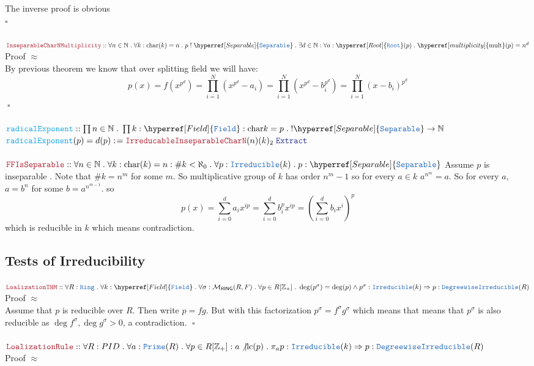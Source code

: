 \documentclass[12pt]{article}
\newcommand{\TYPE}[1]{\textcolor{NavyBlue}{\mathtt{#1}}}
\newcommand{\FUNC}[1]{\textcolor{Cerulean}{\mathtt{#1}}}
\newcommand{\LOGIC}[1]{\textcolor{Blue}{\mathtt{#1}}}
\newcommand{\THM}[1]{\textcolor{Maroon}{\mathtt{#1}}}
\renewcommand{\.}{\; . \;}
\newcommand{\de}{: \kern 0.1pc =}
\newcommand{\IsNot}{\; ! \;}
\newcommand{\NNInt}{\mathbb{Z}_{+} }
\newcommand{\Nat}{\mathbb{N} }
\newcommand{\E}{ \; \LOGIC{Extract} }
\newcommand{\QED}{\; \square}
\newcommand{\Ring}{\TYPE{Ring}}
\newcommand{\RING}{\mathsf{RING}}
\newcommand{\Irr}{\TYPE{Irreducible}}
\newcommand{\Prime}{\TYPE{Prime}}
\newcommand{\DWIrr}{\TYPE{DegreewiseIrreducible}}
\newcommand{\cha}{\mathrm{char}}
\newcommand{\lc}{\mathrm{lc}}
\newcommand{\Field}{\hyperref[Field]{\TYPE{Field}}}
\newcommand{\Root}{\hyperref[Root]{\TYPE{Root}}}
\newcommand{\Sep}{\hyperref[Separable]{\TYPE{Separable}}}
\newcommand{\mult}{\hyperref[multiplicity]{\mathrm{mult}}}
\begin{document}
  The inverse proof is obvious \\ 
  $\square$
  \\ \\
 $
  \THM{InseparableCharNMultiplicity} :: \forall n \in \Nat \. \forall k : 
   \cha(k) =  n  \. 
    p \IsNot \Sep  \. \exists d \in \Nat : \forall a : \Root(p) \. \mult(p) = n^d     
 $  \\
 Proof $\approx$  \\
 By previous theorem we know that over splitting field we will have:
 $$
   p(x) = f \left ( x^{p^d}  \right )  = \prod^N_{i =1}\left (x^{p^d} - a_i \right )
   =  \prod^N_{i =1}\left (x^{p^d} - b_i^{p^d} \right ) = 
   \prod^N_{i =1}\left (x - b_i \right )^{p^d}
 $$
 $
  \QED
 $
 \\ \\
$
 \FUNC{radicalExponent} ::  \prod n \in \Nat \. \prod k : \Field  : \cha k = p \. 
 !\Sep \to \Nat  
$\\
$
 \FUNC{radicalExponent}(p)  = d(p) \de    \THM{IrreducableInseparableCharN}(n)(k)_2 \E 
$
\\ \\
 $
  \THM{FFIsSeparable} :: \forall n \in \Nat \. \forall k : 
   \cha(k) =  n : \# k < \aleph_0 \.       
   \forall p : \Irr (k) \.
   p : \Sep  
 $ 
 Assume $p$ is inseparable . Note that $\# k = n^m  $ for some $m$.  So multiplicative group of $k$ has order $n^m - 1$  so for every $a \in k$ $a^{n^m} = a$. So for every $a$,  $a = b^n$ for some $b = a^{n^{m - 1} }$.  so 
 $$p(x) = \sum_{i = 0}^d a_ix^{ip} = \sum_{i = 0}^d b_i^{p}x^{ip} 
 =   \left (  \sum^d_{i = 0} b_i x^i  \right )^p
  $$ 
 which is reducible in $k$ which means contradiction. 
 \newpage
 \subsection{Tests of Irreducibility} 
  $\THM{LoalizationTHM} :: \forall R : \Ring \. \forall  k : \Field \.
  \forall \sigma : \mathcal{M}_{\RING}{(R,F)} \. \forall p \in R[\NNInt] \. 
   \deg(p^\sigma) = \deg(p) \wedge 
    p^\sigma : \Irr(k) \Rightarrow
    p : \DWIrr(R)    
  $  \\
  Proof $\approx$\\
  
  Assume that $p$ is reducible over $R$. Then write $p = fg$. But with this factorization      $ p^\sigma = f^\sigma g^\sigma $ which means that means that $p^\sigma$ is also reducible as $\deg f^\sigma, \deg g^\sigma > 0$, a contradiction. $\QED$
  \\ \\
    $\THM{LoalizationRule} :: \forall R : PID \. 
  \forall a : \Prime(R) \. \forall p \in R[\NNInt] :  a \not | \lc(p) \.
    \pi_a p : \Irr(k) \Rightarrow
    p : \DWIrr(R)    
  $ \\ 
  Proof $\approx$ \\
  
\end{document}
